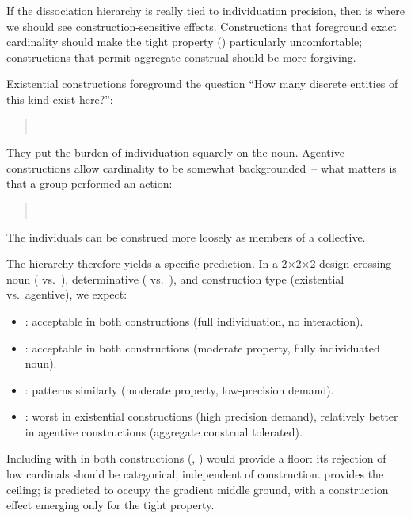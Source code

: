 \documentclass[12pt,a4paper]{article}
\begin{document}
If the dissociation hierarchy is really tied to individuation precision, then  is where we should see construction-sensitive effects. Constructions that foreground exact cardinality should make the tight property () particularly uncomfortable; constructions that permit aggregate construal should be more forgiving.

Existential constructions foreground the question \enquote{How many discrete entities of this kind exist here?}:

\begin{quote}
\\
\end{quote}

They put the burden of individuation squarely on the noun. Agentive constructions allow cardinality to be somewhat backgrounded~-- what matters is that a group performed an action:

\begin{quote}
\\
\end{quote}

The individuals can be construed more loosely as members of a collective.

The hierarchy therefore yields a specific prediction. In a 2$\times$2$\times$2 design crossing noun ( vs.\ ), determinative ( vs.\ ), and construction type (existential vs.\ agentive), we expect:

\begin{itemize}
\item {}: acceptable in both constructions (full individuation, no interaction).
\item {}: acceptable in both constructions (moderate property, fully individuated noun).
\item {}: patterns similarly (moderate property, low-precision demand).
\item {}: worst in existential constructions (high precision demand), relatively better in agentive constructions (aggregate construal tolerated).
\end{itemize}

Including  with  in both constructions (, ) would provide a floor: its rejection of low cardinals should be categorical, independent of construction.  provides the ceiling;  is predicted to occupy the gradient middle ground, with a construction effect emerging only for the tight property.
\end{document}
